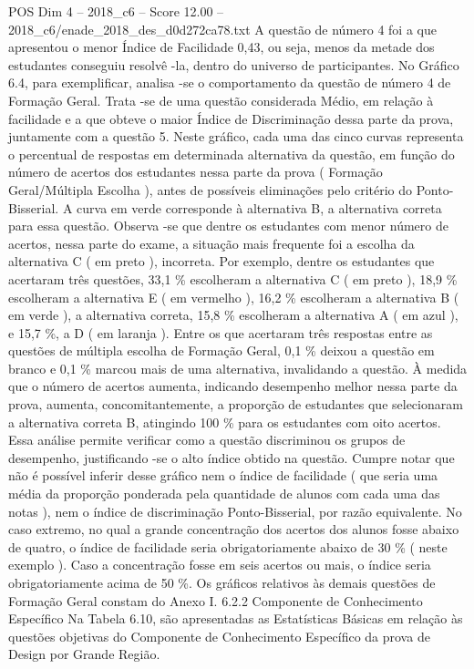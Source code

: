 \begin{textsample}{POS Dim 4 – 2018\_c6 – Score 12.00 – 2018\_c6/enade\_2018\_des\_d0d272ca78.txt}
A questão de número 4 foi a que apresentou o menor Índice de Facilidade 0,43, ou seja, menos da metade dos estudantes conseguiu resolvê -la, dentro do universo de participantes.
No Gráfico 6.4, para exemplificar, analisa -se o comportamento da questão de número 4 de Formação Geral.
Trata -se de uma questão considerada Médio, em relação à facilidade e a que obteve o maior Índice de Discriminação dessa parte da prova, juntamente com a questão 5.
Neste gráfico, cada uma das cinco curvas representa o percentual de respostas em determinada alternativa da questão, em função do número de acertos dos estudantes nessa parte da prova ( Formação Geral/Múltipla Escolha ), antes de possíveis eliminações pelo critério do Ponto-Bisserial.
A curva em verde corresponde à alternativa B, a alternativa correta para essa questão.
Observa -se que dentre os estudantes com menor número de acertos, nessa parte do exame, a situação mais frequente foi a escolha da alternativa C ( em preto ), incorreta.
Por exemplo, dentre os estudantes que acertaram três questões, 33,1 \% escolheram a alternativa C ( em preto ), 18,9 \% escolheram a alternativa E ( em vermelho ), 16,2 \% escolheram a alternativa B ( em verde ), a alternativa correta, 15,8 \% escolheram a alternativa A ( em azul ), e 15,7 \%, a D ( em laranja ).
Entre os que acertaram três respostas entre as questões de múltipla escolha de Formação Geral, 0,1 \% deixou a questão em branco e 0,1 \% marcou mais de uma alternativa, invalidando a questão.
À medida que o número de acertos aumenta, indicando desempenho melhor nessa parte da prova, aumenta, concomitantemente, a proporção de estudantes que selecionaram a alternativa correta B, atingindo 100 \% para os estudantes com oito acertos.
Essa análise permite verificar como a questão discriminou os grupos de desempenho, justificando -se o alto índice obtido na questão.
Cumpre notar que não é possível inferir desse gráfico nem o índice de facilidade ( que seria uma média da proporção ponderada pela quantidade de alunos com cada uma das notas ), nem o índice de discriminação Ponto-Bisserial, por razão equivalente.
No caso extremo, no qual a grande concentração dos acertos dos alunos fosse abaixo de quatro, o índice de facilidade seria obrigatoriamente abaixo de 30 \% ( neste exemplo ).
Caso a concentração fosse em seis acertos ou mais, o índice seria obrigatoriamente acima de 50 \%.
Os gráficos relativos às demais questões de Formação Geral constam do Anexo I. 6.2.2 Componente de Conhecimento Específico Na Tabela 6.10, são apresentadas as Estatísticas Básicas em relação às questões objetivas do Componente de Conhecimento Específico da prova de Design por Grande Região.

\end{textsample}
